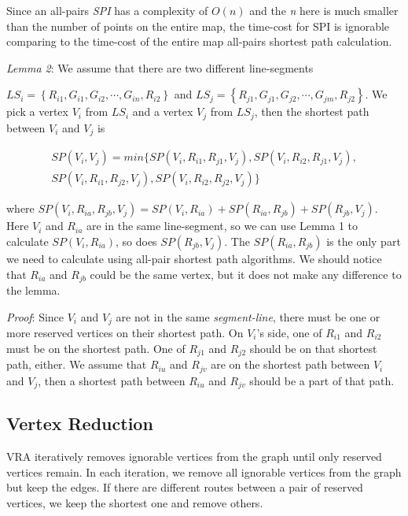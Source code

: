 Since an all-pairs \textit{SPI} has a complexity of $O\left(n\right)$ and the \textit{n} here is much smaller than the number of points on the entire map, the time-cost for SPI is ignorable comparing to the time-cost of the entire map all-pairs shortest path calculation.

\textit{Lemma 2}: We assume that there are two different line-segments 

\noindent ${LS}_i=\left\{R_{i1},G_{i1},G_{i2},\cdots,G_{in},R_{i2}\right\}$ and ${LS}_j=\left\{R_{j1},G_{j1},G_{j2},\cdots,G_{jm},R_{j2}\right\}$. We pick a vertex $V_i$ from $LS_i$ and a vertex $V_j$ from $LS_j$, then the shortest path between $V_i$ and $V_j$ is 

\begin{equation} \label{GrindEQ__VRShortestOutside} 
\begin{split}
SP\left(V_i,V_j\right)=min\{SP\left(V_i,R_{i1},R_{j1},V_j\right),SP\left(V_i,R_{i2},R_{j1},V_j\right), \\
SP\left(V_i,R_{i1},R_{j2},V_j\right),SP\left(V_i,R_{i2},R_{j2},V_j\right)\}
\end{split}
\end{equation}

where ${SP}\left(V_i,R_{ia},R_{jb},V_j\right)={SP}\left(V_i,R_{ia}\right)+{SP}\left(R_{ia},R_{jb}\right)+{SP}\left(R_{jb},V_j\right)$. Here $V_i$ and $R_{ia}$ are in the same line-segment, so we can use Lemma 1 to calculate ${SP}\left(V_i,R_{ia}\right)$, so does ${SP}\left(R_{jb},V_j\right)$. The $SP\left(R_{ia},R_{jb}\right)$ is the only part we need to calculate using all-pair shortest path algorithms. We should notice that $R_{ia}$ and $R_{jb}$ could be the same vertex, but it does not make any difference to the lemma.

\textit{Proof}: Since $V_i$ and $V_j$ are not in the same \textit{segment-line}, there must be one or more reserved vertices on their shortest path. On $V_i$'s side, one of $R_{i1}$ and $R_{i2}$ must be on the shortest path. One of $R_{j1}$ and $R_{j2}$ should be on that shortest path, either. We assume that $R_{iu}$ and $R_{jv}$ are on the shortest path between $V_i$ and $V_j$, then a shortest path between $R_{iu}$ and $R_{jv}$ should be a part of that path.


\subsection{ Vertex Reduction}\label{subsecVR}

\noindent VRA iteratively removes ignorable vertices from the graph until only reserved vertices remain. In each iteration, we remove all ignorable vertices from the graph but keep the edges. If there are different routes between a pair of reserved vertices, we keep the shortest one and remove others. 


